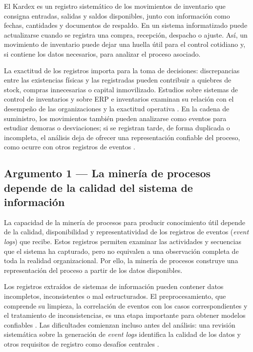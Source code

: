 \documentclass{article}
\begin{document}
    El Kardex es un registro sistemático de los movimientos de inventario que consigna entradas, salidas y saldos disponibles, junto con información como fechas, cantidades y documentos de respaldo. En un sistema informatizado puede actualizarse cuando se registra una compra, recepción, despacho o ajuste. Así, un movimiento de inventario puede dejar una huella útil para el control cotidiano y, si contiene los datos necesarios, para analizar el proceso asociado.

    La exactitud de los registros importa para la toma de decisiones: discrepancias entre las existencias físicas y las registradas pueden contribuir a quiebres de stock, compras innecesarias o capital inmovilizado. Estudios sobre sistemas de control de inventarios y sobre ERP e inventarios examinan su relación con el desempeño de las organizaciones y la exactitud operativa \cite{inventorycontrol2024,inventoryerp2024}. En la cadena de suministro, los movimientos también pueden analizarse como eventos para estudiar demoras o desviaciones; si se registran tarde, de forma duplicada o incompleta, el análisis deja de ofrecer una representación confiable del proceso, como ocurre con otros registros de eventos \cite{marin-castro2021preprocessing}.

    \subsection{Argumento 1 — La minería de procesos depende de la calidad del sistema de información}

    La capacidad de la minería de procesos para producir conocimiento útil depende de la calidad, disponibilidad y representatividad de los registros de eventos (\textit{event logs}) que recibe. Estos registros permiten examinar las actividades y secuencias que el sistema ha capturado, pero no equivalen a una observación completa de toda la realidad organizacional. Por ello, la minería de procesos construye una representación del proceso a partir de los datos disponibles.

    Los registros extraídos de sistemas de información pueden contener datos incompletos, inconsistentes o mal estructurados. El preprocesamiento, que comprende su limpieza, la correlación de eventos con los casos correspondientes y el tratamiento de inconsistencias, es una etapa importante para obtener modelos confiables \cite{marin-castro2021preprocessing}. Las dificultades comienzan incluso antes del análisis: una revisión sistemática sobre la generación de \textit{event logs} identifica la calidad de los datos y otros requisitos de registro como desafíos centrales \cite{eventloggeneration2026}.
\end{document}
